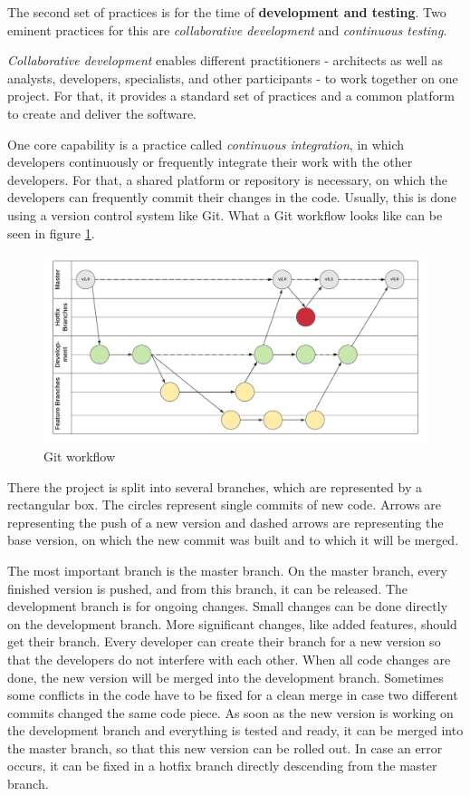 \documentclass[12pt,english,a4paper,oneside,,tablecaptionabove]{scrbook}
\begin{document}
The second set of practices is for the time of \textbf{development and
testing}. Two eminent practices for this are \emph{collaborative
development} and \emph{continuous testing}.

\emph{Collaborative development} enables different practitioners -
architects as well as analysts, developers, specialists, and other
participants - to work together on one project. For that, it provides a
standard set of practices and a common platform to create and deliver
the software.

One core capability is a practice called \emph{continuous integration},
in which developers continuously or frequently integrate their work with
the other developers. For that, a shared platform or repository is
necessary, on which the developers can frequently commit their changes
in the code. Usually, this is done using a version control system like
Git. What a Git workflow looks like can be seen in figure \ref{fig:git}.

\begin{figure}
\hypertarget{fig:git}{%
\centering
\includegraphics[width=6.25in,height=\textheight]{images/chapter2/git_flow.png}
\caption{Git workflow}\label{fig:git}
}
\end{figure}

There the project is split into several branches, which are represented
by a rectangular box. The circles represent single commits of new code.
Arrows are representing the push of a new version and dashed arrows are
representing the base version, on which the new commit was built and to
which it will be merged.

The most important branch is the master branch. On the master branch,
every finished version is pushed, and from this branch, it can be
released. The development branch is for ongoing changes. Small changes
can be done directly on the development branch. More significant
changes, like added features, should get their branch. Every developer
can create their branch for a new version so that the developers do not
interfere with each other. When all code changes are done, the new
version will be merged into the development branch. Sometimes some
conflicts in the code have to be fixed for a clean merge in case two
different commits changed the same code piece. As soon as the new
version is working on the development branch and everything is tested
and ready, it can be merged into the master branch, so that this new
version can be rolled out. In case an error occurs, it can be fixed in a
hotfix branch directly descending from the master branch.
\end{document}
